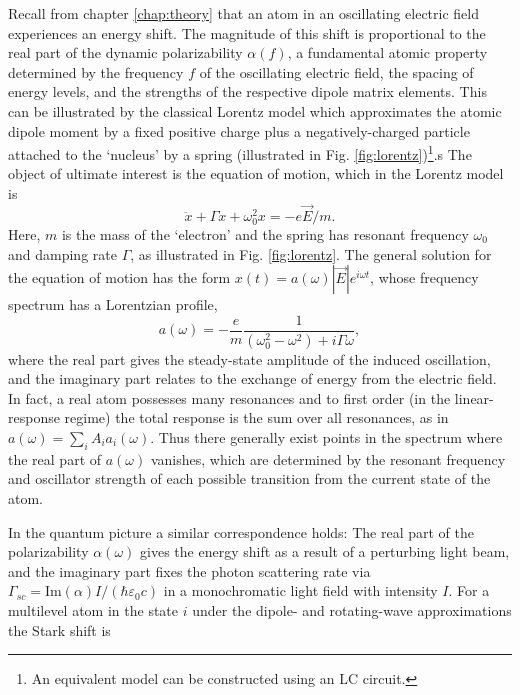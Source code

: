 	Recall from chapter \ref{chap:theory} that an atom in an oscillating electric field experiences an energy shift.
	The magnitude of this shift is proportional to the real part of the dynamic polarizability $\alpha(f)$, a fundamental atomic property determined by the frequency $f$ of the oscillating electric field, the spacing of energy levels, and the strengths of the respective dipole matrix elements.
	This can be illustrated by the classical Lorentz model which approximates the atomic dipole moment by a fixed positive charge plus a negatively-charged particle attached to the `nucleus' by a spring (illustrated in Fig. \ref{fig:lorentz})\footnote{An equivalent model can be constructed using an LC circuit.}.s
	The object of ultimate interest is the equation of motion, which in the Lorentz model is 
	\begin{equation}
		\ddot{x} + \Gamma \dot{x} + \omega_0^2x = -e\vec{E}/m.
	\end{equation}
	Here, $m$ is the mass of the `electron' and the spring has resonant frequency $\omega_0$ and damping rate $\Gamma$, as illustrated in Fig. \ref{fig:lorentz}.
	The general solution for the equation of motion has the form $x(t) = a(\omega)|\vec{E}|e^{i\omega t}$, whose frequency spectrum has a Lorentzian profile,
	\begin{equation}
		a(\omega) = -\frac{e}{m}\frac{1}{(\omega_0^2-\omega^2)+i\Gamma\omega},
	\end{equation}
	where the real part gives the steady-state amplitude of the induced oscillation, and the imaginary part relates to the exchange of energy from the electric field.
	In fact, a real atom possesses many resonances and to first order (in the linear-response regime) the total response is the sum over all resonances, as in $a(\omega) = \sum_i A_i a_i(\omega)$. 
	Thus there generally exist points in the spectrum where the real part of $a(\omega)$ vanishes, which are determined by the resonant frequency and oscillator strength of each possible transition from the current state of the atom.
	
	In the quantum picture a similar correspondence holds: The real part of the polarizability $\alpha(\omega)$ gives the energy shift as a result of a perturbing light beam, and the imaginary part fixes the photon scattering rate  via $\Gamma_{sc} = \textrm{Im}(\alpha)I/(\hbar\varepsilon_0 c)$ in a monochromatic light field with intensity $I$. 
	For a multilevel atom in the state $i$ under the dipole- and rotating-wave approximations \cite{Grimm00} the Stark shift is
	
